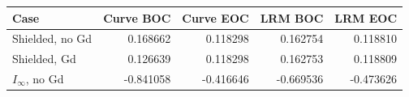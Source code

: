 \begin{center}\small
\begin{tabular}{lrrrr}
\toprule
Case & Curve BOC & Curve EOC & LRM BOC & LRM EOC \\
\midrule
Shielded, no Gd & 0.168662 & 0.118298 & 0.162754 & 0.118810 \\
Shielded, Gd & 0.126639 & 0.118298 & 0.162753 & 0.118809 \\
$I_\infty$, no Gd & -0.841058 & -0.416646 & -0.669536 & -0.473626 \\
\bottomrule
\end{tabular}
\end{center}
